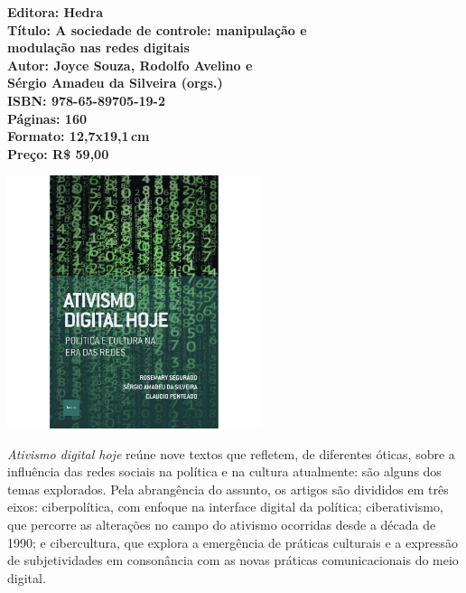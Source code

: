 \vfill
\noindent\begin{minipage}[c]{1\linewidth}
{\small\textbf{
\hspace*{-.1cm}Editora: Hedra\\
Título: A sociedade de controle: manipulação e\\modulação nas redes digitais\\
Autor: Joyce Souza, Rodolfo Avelino e\\Sérgio Amadeu da Silveira (orgs.)\\ 
ISBN: 978-65-89705-19-2\\
Páginas: 160\\
Formato: 12,7x19,1\,cm\\
Preço: R\$ 59,00\\
}}
\end{minipage}
\pagebreak

\begin{center}
\hspace*{.5cm}\includegraphics[width=74mm]{./CAPAS/AMADEU_ATIVISMO.jpg}
\end{center}
\hspace*{-7cm}\hrulefill\hspace*{-7cm}
\medskip

\noindent{}\textit{Ativismo digital hoje} reúne nove textos que refletem, de diferentes óticas, sobre a influência das redes sociais na política e na cultura atualmente:  são alguns dos temas explorados.
Pela abrangência do assunto, os artigos são divididos em três eixos: ciberpolítica, com enfoque na interface digital da política; ciberativismo, que percorre as alterações no campo do ativismo ocorridas desde a década de 1990; e cibercultura, que explora a emergência de práticas culturais e a expressão de subjetividades em consonância com as novas práticas comunicacionais do meio digital.

